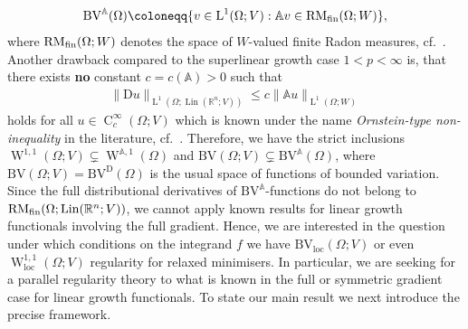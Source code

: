 \documentclass[a4paper,10pt,reqno,oneside]{amsart}
\numberwithin{equation}{section}
\newcommand{\R}{\mathbb R}
\newcommand{\Aop}{\mathbb{A}}
\newcommand{\lebe}{\operatorname{L}}
\newcommand{\sobo}{\operatorname{W}}
\newcommand{\hold}{\operatorname{C}}
\newcommand{\BV}{\mathrm{BV}}
\newcommand{\loc}{\mathrm{loc}}
\newcommand{\D}{\mathrm{D}}
\DeclareMathOperator{\Lin}{Lin}
\begin{document}
\begin{equation*}
	\BV^\Aop (\Omega) \coloneqq \{v\in\lebe^1(\Omega; V): \Aop v \in \mathrm{RM}_{\rm fin}(\Omega;W)\},
\end{equation*}
where $\mathrm{RM}_{\rm fin}(\Omega;W)$ denotes the space of $W$-valued finite Radon measures, cf.~\cite{BDG}. 
 Another drawback compared to the superlinear growth case $1<p<\infty$ is, that there exists \textbf{no} constant $c=c(\Aop)>0$ such that  
\begin{align*}
	\|\D u\|_{\lebe^1(\Omega;\Lin(\R^n;V))}\leq c\|\Aop u\|_{\lebe^1(\Omega;W)}
\end{align*}
holds for all $u\in\hold^\infty_c(\Omega;V)$ which is known under the name \emph{Ornstein-type non-inequality} in the literature, cf.~\cite[Thm. 1.3]{KirchheimKristensen}. Therefore, we have the strict inclusions $\sobo^{1,1}(\Omega;V) \subsetneq \sobo^{\Aop,1}(\Omega)$ and $\BV(\Omega;V)\subsetneq \BV^\Aop(\Omega)$, where $\BV(\Omega;V) = \BV^\D(\Omega)$ is the usual space of functions of bounded variation. Since the full distributional derivatives of $\BV^\Aop$-functions do not belong to $\mathrm{RM}_{\rm fin}(\Omega;\Lin(\R^n;V))$, we cannot apply known results for linear growth functionals involving the full gradient. Hence, we are interested in the question under which conditions on the integrand $f$ we have $\BV_\loc(\Omega;V)$ or even $\sobo^{1,1}_\loc(\Omega;V)$ regularity for relaxed minimisers. In particular, we are seeking for a parallel regularity theory to what is known in the full or symmetric gradient case for linear growth functionals. To state our main result we next introduce the precise framework. 
\end{document}
